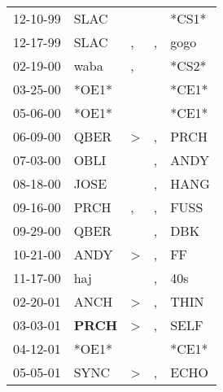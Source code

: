 \begin{supertabular}{p{0.07\textwidth}p{0.06\textwidth}p{0.02\textwidth}p{0.02\textwidth}p{0.06\textwidth}}
 12-10-99\textsuperscript{} &           SLAC\textsuperscript{} &               &               &                   *CS1* \\
 12-17-99\textsuperscript{} &           SLAC\textsuperscript{} &             , &             , &  gogo\textsuperscript{} \\
 02-19-00\textsuperscript{} &           waba\textsuperscript{} &             , &               &                   *CS2* \\
 03-25-00\textsuperscript{} &                            *OE1* &               &               &                   *CE1* \\
 05-06-00\textsuperscript{} &                            *OE1* &               &               &                   *CE1* \\
 06-09-00\textsuperscript{} &           QBER\textsuperscript{} &  \textgreater &             , &  PRCH\textsuperscript{} \\
 07-03-00\textsuperscript{} &           OBLI\textsuperscript{} &               &             , &  ANDY\textsuperscript{} \\
 08-18-00\textsuperscript{} &           JOSE\textsuperscript{} &               &             , &  HANG\textsuperscript{} \\
 09-16-00\textsuperscript{} &           PRCH\textsuperscript{} &             , &             , &  FUSS\textsuperscript{} \\
 09-29-00\textsuperscript{} &           QBER\textsuperscript{} &               &             , &   DBK\textsuperscript{} \\
 10-21-00\textsuperscript{} &           ANDY\textsuperscript{} &  \textgreater &             , &    FF\textsuperscript{} \\
 11-17-00\textsuperscript{} &            haj\textsuperscript{} &               &             , &   40s\textsuperscript{} \\
 02-20-01\textsuperscript{} &           ANCH\textsuperscript{} &  \textgreater &             , &  THIN\textsuperscript{} \\
 03-03-01\textsuperscript{} &  \textbf{PRCH\textsuperscript{}} &  \textgreater &             , &  SELF\textsuperscript{} \\
 04-12-01\textsuperscript{} &                            *OE1* &               &               &                   *CE1* \\
 05-05-01\textsuperscript{} &           SYNC\textsuperscript{} &  \textgreater &             , &  ECHO\textsuperscript{} \\

\end{supertabular}
